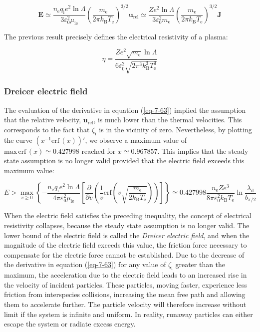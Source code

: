 \begin{equation}
    \mathbf{E}\simeq\frac{n_\text{e}q_\mathrm{i}e^2\ln{\Lambda}}{3\varepsilon_0^2\mu_\text{ie}}\left(\frac{m_\text{e}}{2\pi k_\mathrm{B}T_\text{e}}\right)^{3/2}\mathbf{u}_\text{rel}\simeq\frac{Ze^2\ln{\Lambda}}{3\varepsilon_0^2 m_\text{e}}\left(\frac{m_\text{e}}{2\pi k_\mathrm{B}T_\text{e}}\right)^{3/2}\mathbf{J}
\end{equation}

The previous result precisely defines the electrical resistivity of a plasma:

\begin{equation}
    \eta=\frac{Ze^2\sqrt{m_\text{e}}\ln{\Lambda}}{6\varepsilon_0^2\sqrt{2\pi^3k_\mathrm{B}^3T_\text{e}^3}}
\end{equation}

\subsubsection{Dreicer electric field}

The evaluation of the derivative in equation (\ref{eq-7-63}) implied the assumption that the relative velocity, $\mathbf{u}_\text{rel}$, is much lower than the thermal velocities. This corresponds to the fact that $\zeta_\mathrm{i}$ is in the vicinity of zero. Nevertheless, by plotting the curve $(x^{-1}\mathrm{erf}\,(x))'$, we observe a maximum value of $\text{max}\,\mathrm{erf}\,(x)\simeq0.427998$ reached for $x\simeq0.967857$. This implies that the steady state assumption is no longer valid provided that the electric field exceeds this maximum value:

\begin{equation}
    E>\max_{v\geq0}{\left\{-\frac{n_\text{e}q_\mathrm{i}e^2\ln{\Lambda}}{4\pi\varepsilon_0^2\mu_\text{ie}}\left[\frac{\partial}{\partial v}\left(\frac{1}{v}\mathrm{erf}\left(v\sqrt{\frac{m_\text{e}}{2k_\mathrm{B}T_\text{e}}}\right)\right)\right]\right\}}\simeq0.427998\frac{n_\text{e}Ze^3}{8\pi\varepsilon_0^2k_\mathrm{B}T_\text{e}}\ln{\frac{\lambda_\mathrm{d}}{b_{\pi/2}}}
\end{equation}

When the electric field satisfies the preceding inequality, the concept of electrical resistivity collapses, because the steady state assumption is no longer valid. The lower bound of the electric field is called the \textit{Dreicer electric field}, and when the magnitude of the electric field exceeds this value, the friction force necessary to compensate for the electric force cannot be established. Due to the decrease of the derivative in equation (\ref{eq-7-63}) for any value of $\zeta_\mathrm{i}$ greater than the maximum, the acceleration due to the electric field leads to an increased rise in the velocity of incident particles. These particles, moving faster, experience less friction from interspecies collisions, increasing the mean free path and allowing them to accelerate further. The particle velocity will therefore increase without limit if the system is infinite and uniform. In reality, runaway particles can either escape the system or radiate excess energy.

